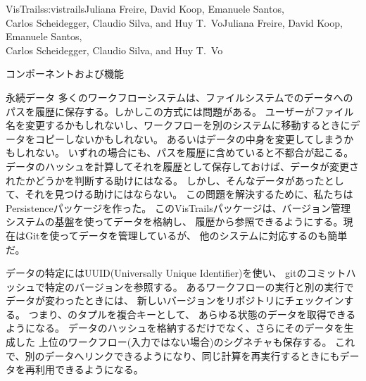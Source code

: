 \begin{aosachaptertoc}{VisTrails}{s:vistrails}{Juliana Freire, David Koop, Emanuele Santos, \\ Carlos Scheidegger, Claudio Silva, and Huy T.\ Vo}{Juliana Freire, David Koop, Emanuele Santos, \\ \hspace*{0.9cm} Carlos Scheidegger, Claudio Silva, and Huy T.\ Vo}
\begin{aosasect1}{コンポーネントおよび機能}
\begin{aosasect2}{永続データ}
多くのワークフローシステムは、ファイルシステムでのデータへのパスを履歴に保存する。しかしこの方式には問題がある。
ユーザーがファイル名を変更するかもしれないし、ワークフローを別のシステムに移動するときにデータをコピーしないかもしれない。
あるいはデータの中身を変更してしまうかもしれない。
いずれの場合にも、パスを履歴に含めていると不都合が起こる。
データのハッシュを計算してそれを履歴として保存しておけば、データが変更されたかどうかを判断する助けにはなる。
しかし、そんなデータがあったとして、それを見つける助けにはならない。
この問題を解決するために、私たちはPersistenceパッケージを作った。
このVisTrailsパッケージは、バージョン管理システムの基盤を使ってデータを格納し、
履歴から参照できるようにする。現在はGitを使ってデータを管理しているが、
他のシステムに対応するのも簡単だ。

データの特定にはUUID(Universally Unique Identifier)を使い、
gitのコミットハッシュで特定のバージョンを参照する。
あるワークフローの実行と別の実行でデータが変わったときには、
新しいバージョンをリポジトリにチェックインする。
つまり、のタプルを複合キーとして、
あらゆる状態のデータを取得できるようになる。
データのハッシュを格納するだけでなく、さらにそのデータを生成した
上位のワークフロー(入力ではない場合)のシグネチャも保存する。
これで、別のデータへリンクできるようになり、同じ計算を再実行するときにもデータを再利用できるようになる。


\end{aosasect2}
\end{aosasect1}
\end{aosachaptertoc}
